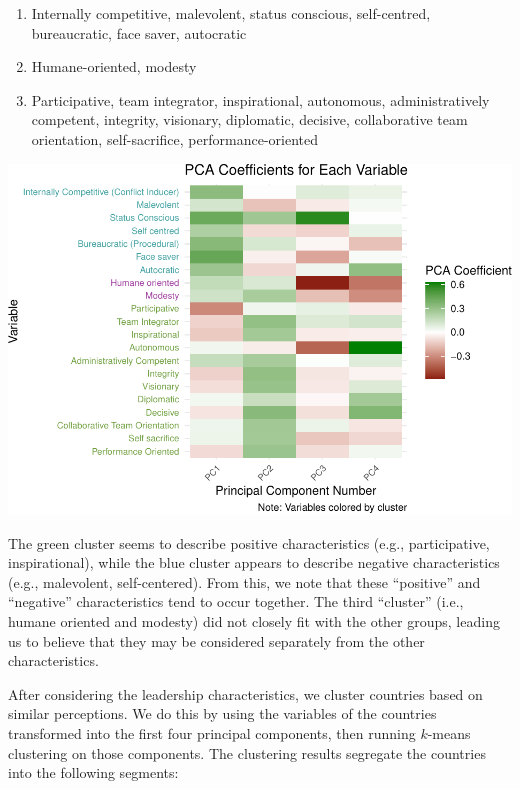 \documentclass[
]{article}
\providecommand{\tightlist}{%
  \setlength{\itemsep}{0pt}\setlength{\parskip}{0pt}}
\begin{document}
\begin{enumerate}
\def\labelenumi{\arabic{enumi}.}
\tightlist
\item
  \textcolor{clust1}{Internally competitive, malevolent, status conscious, self-centred, bureaucratic, face saver, autocratic}
\item
  \textcolor{clust2}{Humane-oriented, modesty}
\item
  \textcolor{clust3}{Participative, team integrator, inspirational, autonomous, administratively competent, integrity, visionary, diplomatic, decisive, collaborative team orientation, self-sacrifice, performance-oriented}
\end{enumerate}

\begin{center}\includegraphics[width=0.85\linewidth]{report_files/figure-latex/pca_heatmap-1} \end{center}

The green cluster seems to describe positive characteristics (e.g.,
participative, inspirational), while the blue cluster appears to
describe negative characteristics (e.g., malevolent, self-centered).
From this, we note that these ``positive'' and ``negative''
characteristics tend to occur together. The third ``cluster'' (i.e.,
humane oriented and modesty) did not closely fit with the other groups,
leading us to believe that they may be considered separately from the
other characteristics.

After considering the leadership characteristics, we cluster countries
based on similar perceptions. We do this by using the variables of the
countries transformed into the first four principal components, then
running \(k\)-means clustering on those components. The clustering
results segregate the countries into the following segments:
\end{document}

